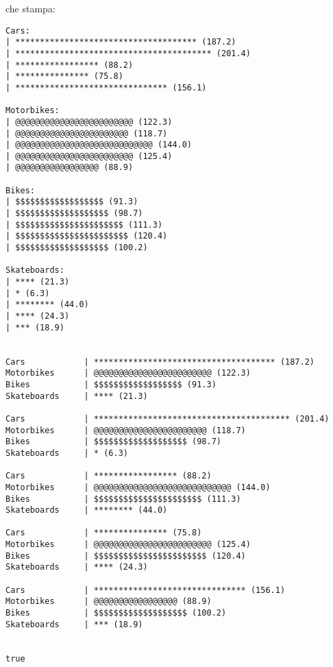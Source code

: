 \documentclass{article}[10pt]
\begin{document}
\noindent
che stampa:
%
{\scriptsize
\begin{verbatim}
Cars:
| ************************************* (187.2)
| **************************************** (201.4)
| ***************** (88.2)
| *************** (75.8)
| ******************************* (156.1)

Motorbikes:
| @@@@@@@@@@@@@@@@@@@@@@@@ (122.3)
| @@@@@@@@@@@@@@@@@@@@@@@ (118.7)
| @@@@@@@@@@@@@@@@@@@@@@@@@@@@ (144.0)
| @@@@@@@@@@@@@@@@@@@@@@@@ (125.4)
| @@@@@@@@@@@@@@@@@ (88.9)

Bikes:
| $$$$$$$$$$$$$$$$$$ (91.3)
| $$$$$$$$$$$$$$$$$$$ (98.7)
| $$$$$$$$$$$$$$$$$$$$$$ (111.3)
| $$$$$$$$$$$$$$$$$$$$$$$ (120.4)
| $$$$$$$$$$$$$$$$$$$ (100.2)

Skateboards:
| **** (21.3)
| * (6.3)
| ******** (44.0)
| **** (24.3)
| *** (18.9)


Cars            | ************************************* (187.2)
Motorbikes      | @@@@@@@@@@@@@@@@@@@@@@@@ (122.3)
Bikes           | $$$$$$$$$$$$$$$$$$ (91.3)
Skateboards     | **** (21.3)

Cars            | **************************************** (201.4)
Motorbikes      | @@@@@@@@@@@@@@@@@@@@@@@ (118.7)
Bikes           | $$$$$$$$$$$$$$$$$$$ (98.7)
Skateboards     | * (6.3)

Cars            | ***************** (88.2)
Motorbikes      | @@@@@@@@@@@@@@@@@@@@@@@@@@@@ (144.0)
Bikes           | $$$$$$$$$$$$$$$$$$$$$$ (111.3)
Skateboards     | ******** (44.0)

Cars            | *************** (75.8)
Motorbikes      | @@@@@@@@@@@@@@@@@@@@@@@@ (125.4)
Bikes           | $$$$$$$$$$$$$$$$$$$$$$$ (120.4)
Skateboards     | **** (24.3)

Cars            | ******************************* (156.1)
Motorbikes      | @@@@@@@@@@@@@@@@@ (88.9)
Bikes           | $$$$$$$$$$$$$$$$$$$ (100.2)
Skateboards     | *** (18.9)


true
\end{verbatim}
}
\end{document}
